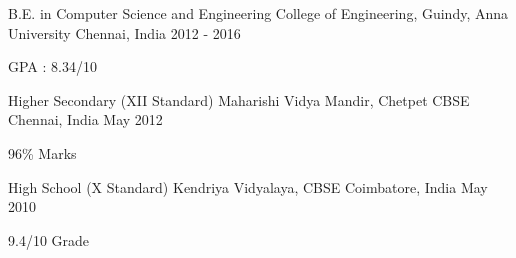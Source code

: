 

\begin{cventries}

  \cventry
    {B.E. in Computer Science and Engineering} %
    {College of Engineering, Guindy, Anna University} %
    {Chennai, India} %
    {2012 - 2016} %
    {
      \begin{cvitems} %
        \item {GPA : 8.34/10}
      \end{cvitems}
    }
  \cventry
    {Higher  Secondary  (XII  Standard)} %
    {Maharishi  Vidya  Mandir, Chetpet CBSE} %
    {Chennai, India} %
    {May 2012} %
    {
      \begin{cvitems} %
        \item {96\% Marks}
      \end{cvitems}
    }
  \cventry
    {High  School  (X  Standard)} %
    {Kendriya  Vidyalaya, CBSE} %
    {Coimbatore, India} %
    {May 2010} %
    {
      \begin{cvitems} %
        \item {9.4/10 Grade}
      \end{cvitems}
    }
\end{cventries}